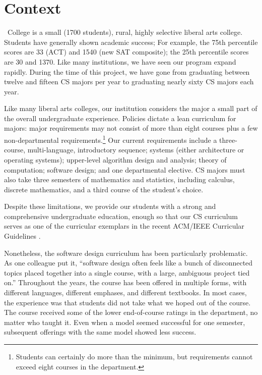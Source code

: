 \section{Context}

\college\ College is a small (1700 students), rural, highly selective
liberal arts college.  Students have generally shown academic
success; For example, the 75th percentile scores are 33 (ACT) and
1540 (new SAT composite); the 25th percentile scores are 30 and
1370.  Like many institutions, we have seen our program expand
rapidly.  During the time of this project, we have gone from
graduating between twelve and fifteen CS majors per year to graduating
nearly sixty CS majors each year.

Like many liberal arts colleges, our institution considers the major a
small part of the overall undergraduate experience.  Policies dictate
a lean curriculum for majors: major requirements may
not consist of more than eight courses plus a few non-departmental
requirements.\footnote{Students can certainly do more than the
minimum, but requirements cannot exceed eight
courses in the department.} Our current 
requirements include a three-course, multi-language, introductory
sequence; systems (either architecture or operating systems);
upper-level algorithm design and analysis; theory of computation;
software design; and one departmental elective.  CS majors must
also take three semesters of mathematics and statistics, including
calculus, discrete mathematics, and a third course of the student's
choice.  

Despite these limitations, we provide our students with a strong
and comprehensive undergraduate education, enough so that our
CS curriculum serves as one of the curricular exemplars in the
recent ACM/IEEE Curricular Guidelines \cite{curriculum-2013}.

Nonetheless, the software design curriculum has been particularly
problematic.  As one colleague put it, ``software design often feels
like a bunch of disconnected topics placed together into a single
course, with a large, ambiguous project tied on.''  Throughout the
years, the course has been offered in multiple forms, with different
languages, different emphases, and different textbooks.  In most
cases, the experience was that students did not take what we hoped
out of the course. The course received some of the lower
end-of-course ratings in the department, no matter who taught it.
Even when a model seemed successful for one semester, subsequent
offerings with the same model showed less success.

